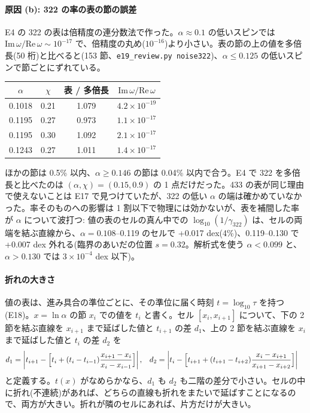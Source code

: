 \paragraph{原因 (b): 322 の率の表の節の誤差}
E4 の 322 の表は倍精度の連分数法で作った。$\alpha\approx0.1$ の低いスピンでは $\mathrm{Im}\,\omega/\mathrm{Re}\,\omega\sim10^{-17}$ で、倍精度の丸め($10^{-16}$)より小さい。表の節の上の値を多倍長(50 桁)と比べると(153 節、\texttt{e19\_review.py noise322})、$\alpha\le0.125$ の低いスピンで節ごとにずれている。
\begin{center}\small
\begin{tabular}{cccc}
\toprule
$\alpha$ & $\chi$ & 表 / 多倍長 & $\mathrm{Im}\,\omega/\mathrm{Re}\,\omega$\\
\midrule
0.1018 & 0.21 & 1.079 & $4.2\times10^{-19}$\\
0.1195 & 0.27 & 0.973 & $1.1\times10^{-17}$\\
0.1195 & 0.30 & 1.092 & $2.1\times10^{-17}$\\
0.1243 & 0.27 & 1.011 & $1.4\times10^{-17}$\\
\bottomrule
\end{tabular}
\end{center}
ほかの節は 0.5\% 以内、$\alpha\ge0.146$ の節は 0.04\% 以内で合う。E4 で 322 を多倍長と比べたのは $(\alpha,\chi)=(0.15,0.9)$ の 1 点だけだった。433 の表が同じ理由で使えないことは E17 で見つけていたが、322 の低い $\alpha$ の端は確かめていなかった。率そのものへの影響は 1 割以下で物理には効かないが、表を補間した率が $\alpha$ について波打つ: 値の表のセルの真ん中での $\log_{10}(1/\gamma_{322})$ は、セルの両端を結ぶ直線から、$\alpha=0.108$--0.119 のセルで +0.017 dex(4\%)、0.119--0.130 で +0.007 dex 外れる(臨界のあいだの位置 $s=0.32$。解析式を使う $\alpha<0.099$ と、$\alpha>0.130$ では $3\times10^{-4}$ dex 以下)。

\paragraph{折れの大きさ}
値の表は、進み具合の準位ごとに、その準位に届く時刻 $t=\log_{10}\tau$ を持つ(E18)。$x=\ln\alpha$ の節 $x_i$ での値を $t_i$ と書く。セル $[x_i,x_{i+1}]$ について、下の 2 節を結ぶ直線を $x_{i+1}$ まで延ばした値と $t_{i+1}$ の差 $d_1$、上の 2 節を結ぶ直線を $x_i$ まで延ばした値と $t_i$ の差 $d_2$ を
\begin{align}
d_1&=\left|t_{i+1}-\Bigl[t_i+(t_i-t_{i-1})\frac{x_{i+1}-x_i}{x_i-x_{i-1}}\Bigr]\right|,&
d_2&=\left|t_i-\Bigl[t_{i+1}+(t_{i+1}-t_{i+2})\frac{x_i-x_{i+1}}{x_{i+1}-x_{i+2}}\Bigr]\right|
\label{eq:e19d}
\end{align}
と定義する。$t(x)$ がなめらかなら、$d_1$ も $d_2$ も二階の差分で小さい。セルの中に折れ(不連続)があれば、どちらの直線も折れをまたいで延ばすことになるので、両方が大きい。折れが隣のセルにあれば、片方だけが大きい。

